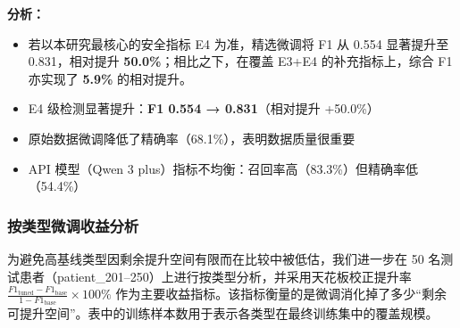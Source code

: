 \documentclass[11pt]{article}
\begin{document}
\textbf{分析：}

\begin{itemize}
\item
  若以本研究最核心的安全指标 E4 为准，精选微调将 F1 从 0.554 显著提升至 0.831，相对提升 \textbf{50.0\%}；相比之下，在覆盖 E3+E4 的补充指标上，综合 F1 亦实现了 \textbf{5.9\%} 的相对提升。
\item
  E4 级检测显著提升：\textbf{F1 0.554 → 0.831}（相对提升 +50.0\%）
\item
  原始数据微调降低了精确率（68.1\%），表明数据质量很重要
\item
  API 模型（Qwen 3 plus）指标不均衡：召回率高（83.3\%）但精确率低（54.4\%）
\end{itemize}

\subsubsection{按类型微调收益分析}

为避免高基线类型因剩余提升空间有限而在比较中被低估，我们进一步在 50 名测试患者（patient\_201--250）上进行按类型分析，并采用天花板校正提升率 \(\frac{F1_{\text{tuned}} - F1_{\text{base}}}{1 - F1_{\text{base}}} \times 100\%\) 作为主要收益指标。该指标衡量的是微调消化掉了多少``剩余可提升空间''。表中的训练样本数用于表示各类型在最终训练集中的覆盖规模。
\end{document}

